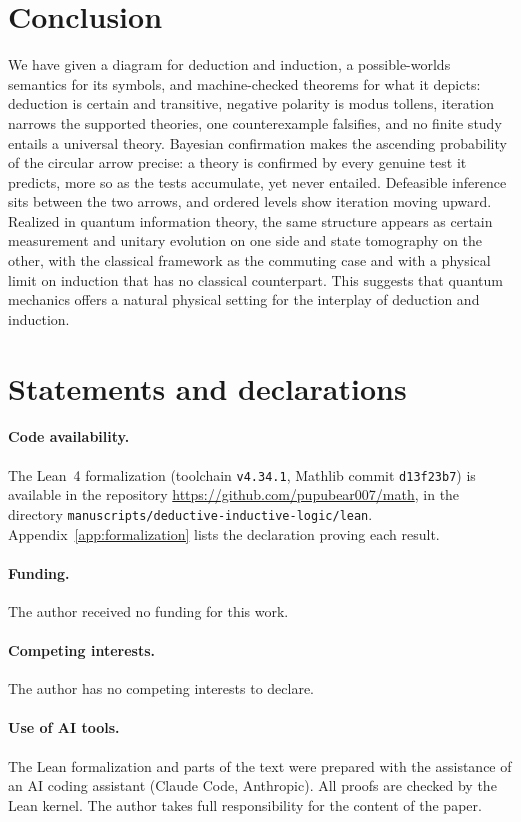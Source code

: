 \section{Conclusion}

We have given a diagram for deduction and induction, a possible-worlds semantics for its symbols,
and machine-checked theorems for what it depicts: deduction is certain and transitive, negative
polarity is modus tollens, iteration narrows the supported theories, one counterexample falsifies,
and no finite study entails a universal theory. Bayesian confirmation makes the ascending
probability of the circular arrow precise: a theory is confirmed by every genuine test it
predicts, more so as the tests accumulate, yet never entailed. Defeasible inference sits between
the two arrows, and ordered levels show iteration moving upward. Realized in quantum information
theory, the same structure appears as certain measurement and unitary evolution on one side and
state tomography on the other, with the classical framework as the commuting case and with a
physical limit on induction that has no classical counterpart. This suggests that quantum
mechanics offers a natural physical setting for the interplay of deduction and induction.

\section*{Statements and declarations}

\paragraph{Code availability.} The Lean~4 formalization (toolchain \texttt{v4.34.1}, Mathlib commit
\texttt{d13f23b7}) is available in the repository \url{https://github.com/pupubear007/math}, in
the directory \texttt{manuscripts/\allowbreak deductive-inductive-logic/\allowbreak lean}. Appendix~\ref{app:formalization} lists the
declaration proving each result.

\paragraph{Funding.} The author received no funding for this work.

\paragraph{Competing interests.} The author has no competing interests to declare.

\paragraph{Use of AI tools.} The Lean formalization and parts of the text were prepared with the
assistance of an AI coding assistant (Claude Code, Anthropic). All proofs are checked by the Lean
kernel. The author takes full responsibility for the content of the paper.
